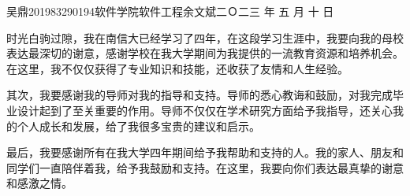 \documentclass[a4paper]{nuist}
\begin{document}
{吴鼎}{201983290194}{软件学院}{软件工程}{余文斌}{二Ｏ二三\hspace{0.4em} 年\hspace{0.4em} 五\hspace{0.4em} 月\hspace{0.4em} 十\hspace{0.4em} 日}

\mytableofcontents












\clearpage %

% 

\thanking
{
    时光白驹过隙，我在南信大已经学习了四年，在这段学习生涯中，我要向我的母校表达最深切的谢意，感谢学校在我大学期间为我提供的一流教育资源和培养机会。在这里，我不仅仅获得了专业知识和技能，还收获了友情和人生经验。

    其次，我要感谢我的导师对我的指导和支持。导师的悉心教诲和鼓励，对我完成毕业设计起到了至关重要的作用。导师不仅仅在学术研究方面给予我指导，还关心我的个人成长和发展，给了我很多宝贵的建议和启示。
    
    最后，我要感谢所有在我大学四年期间给予我帮助和支持的人。我的家人、朋友和同学们一直陪伴着我，给予我鼓励和支持。在这里，我要向你们表达最真挚的谢意和感激之情。
}
\end{document}

